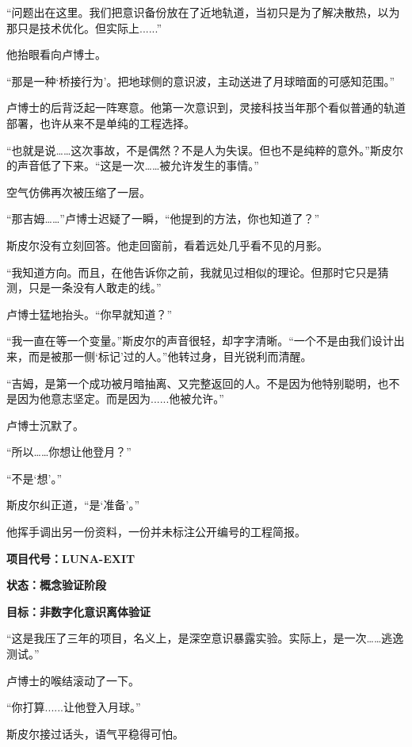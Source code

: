 “问题出在这里。我们把意识备份放在了近地轨道，当初只是为了解决散热，以为那只是技术优化。但实际上......”

他抬眼看向卢博士。

“那是一种‘桥接行为’。把地球侧的意识波，主动送进了月球暗面的可感知范围。”

卢博士的后背泛起一阵寒意。他第一次意识到，灵接科技当年那个看似普通的轨道部署，也许从来不是单纯的工程选择。

“也就是说……这次事故，不是偶然？不是人为失误。但也不是纯粹的意外。”斯皮尔的声音低了下来。“这是一次……被允许发生的事情。”

空气仿佛再次被压缩了一层。

“那吉姆……”卢博士迟疑了一瞬，“他提到的方法，你也知道了？”

斯皮尔没有立刻回答。他走回窗前，看着远处几乎看不见的月影。

“我知道方向。而且，在他告诉你之前，我就见过相似的理论。但那时它只是猜测，只是一条没有人敢走的线。”

卢博士猛地抬头。“你早就知道？”

“我一直在等一个变量。”斯皮尔的声音很轻，却字字清晰。“一个不是由我们设计出来，而是被那一侧‘标记’过的人。”他转过身，目光锐利而清醒。

“吉姆，是第一个成功被月暗抽离、又完整返回的人。不是因为他特别聪明，也不是因为他意志坚定。而是因为......他被允许。”

卢博士沉默了。

“所以……你想让他登月？”

“不是‘想’。”

斯皮尔纠正道，“是‘准备’。”

他挥手调出另一份资料，一份并未标注公开编号的工程简报。

\begin{center}
\textbf{项目代号：LUNA-EXIT}
\end{center}

\begin{center}
\textbf{状态：概念验证阶段}
\end{center}

\begin{center}
\textbf{目标：非数字化意识离体验证}
\end{center}

“这是我压了三年的项目，名义上，是深空意识暴露实验。实际上，是一次……逃逸测试。”

卢博士的喉结滚动了一下。

“你打算......让他登入月球。”

斯皮尔接过话头，语气平稳得可怕。


